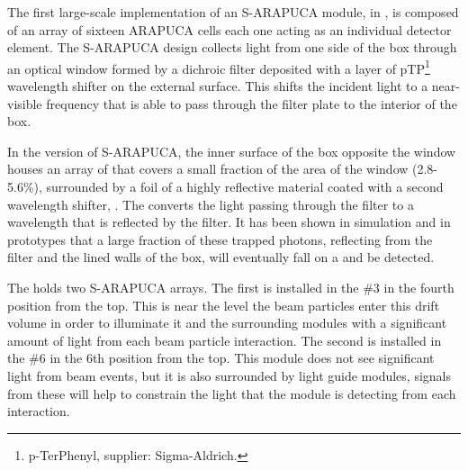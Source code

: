 The first large-scale implementation of an S-ARAPUCA module, in , is composed of an array of sixteen ARAPUCA cells each one acting as an individual detector element. 
The S-ARAPUCA design collects light from one side of the box through an optical window formed by a dichroic filter deposited with a layer of pTP\footnote{p-TerPhenyl, supplier: Sigma-Aldrich\textregistered.}
wavelength shifter on the external surface. This shifts the incident  light to a near-visible frequency that is able to pass through the filter plate to the interior of the box.  

In the  version of S-ARAPUCA, the inner surface of the box opposite the window houses an array of  that covers a small fraction of the area of the window (2.8-5.6\%), surrounded by a foil of a highly reflective material coated with a second wavelength shifter, . The  converts the light passing through the filter to a wavelength that is reflected by the filter. It has been shown in simulation and in prototypes that a large fraction of these trapped photons, reflecting from the filter and the lined walls of the box, will eventually fall on a  and be detected.

The  holds two S-ARAPUCA arrays. The first is installed in the  \#3 in the fourth position from the top.  This is near the level the beam particles enter this drift volume in order to illuminate it and the surrounding modules with a significant amount of light from each beam particle interaction.
The second  is installed in the  \#6 in the 6th position from the top.  This module does not see significant light from beam events, but it is also surrounded by light guide modules, signals from these will help to constrain the light that the module is detecting from each interaction.
 

